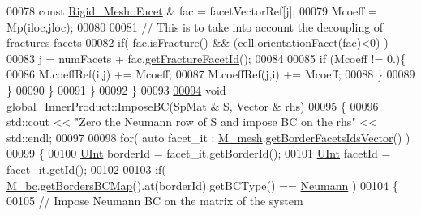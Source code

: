 \begin{DoxyCode}
00078                 \textcolor{keyword}{const} \hyperlink{classFVCode3D_1_1Rigid__Mesh_1_1Facet}{Rigid\_Mesh::Facet} & fac = facetVectorRef[j];
00079                 Mcoeff = Mp(iloc,jloc);
00080                 
00081                 \textcolor{comment}{// This is to take into account the decoupling of fractures facets}
00082                                 \textcolor{keywordflow}{if}( fac.\hyperlink{classFVCode3D_1_1Rigid__Mesh_1_1Facet_aed3f579d52847e839501f647e90c35ab}{isFracture}() && (cell.orientationFacet(fac)<0) )
00083                                         j = numFacets + fac.\hyperlink{classFVCode3D_1_1Rigid__Mesh_1_1Facet_a08dc369eccd02b29133187cede7511eb}{getFractureFacetId}();
00084 
00085                 \textcolor{keywordflow}{if} (Mcoeff != 0.)\{
00086                     M.coeffRef(i,j) += Mcoeff;
00087                     M.coeffRef(j,i) += Mcoeff;
00088                 \} 
00089             \}
00090         \}
00091         \}
00092 \}
00093 
\hypertarget{global__operator_8cpp_source.tex_l00094}{}\hyperlink{classFVCode3D_1_1global__InnerProduct_a708f68bfd33ad98c55d64c0098733fed}{00094} \textcolor{keywordtype}{void} \hyperlink{classFVCode3D_1_1global__InnerProduct_a708f68bfd33ad98c55d64c0098733fed}{global\_InnerProduct::ImposeBC}(\hyperlink{namespaceFVCode3D_ac1032289d96638cf0ad6c52ef639095f}{SpMat} & S, 
      \hyperlink{namespaceFVCode3D_a16ccf345652402bccd1a5d2e6782526c}{Vector} & rhs)      
00095 \{
00096         std::cout << \textcolor{stringliteral}{"Zero the Neumann row of S and impose BC on the rhs"} << std::endl;
00097         
00098         \textcolor{keywordflow}{for}( \textcolor{keyword}{auto} facet\_it : \hyperlink{classFVCode3D_1_1global__Operator_a027911d0f801f6f19a3006329ec30a7f}{M\_mesh}.\hyperlink{classFVCode3D_1_1Rigid__Mesh_aa72b7fad937f0d1586fc10b176ef5d3e}{getBorderFacetsIdsVector}() )
00099         \{       
00100                 \hyperlink{namespaceFVCode3D_a4bf7e328c75d0fd504050d040ebe9eda}{UInt} borderId = facet\_it.getBorderId();
00101                 \hyperlink{namespaceFVCode3D_a4bf7e328c75d0fd504050d040ebe9eda}{UInt} facetId  = facet\_it.getId();
00102                         
00103                 \textcolor{keywordflow}{if}( \hyperlink{classFVCode3D_1_1global__InnerProduct_a62bbb87bc4710a73980603b8b77ffda8}{M\_bc}.\hyperlink{classFVCode3D_1_1BoundaryConditions_a5b53a81bdab88709fae14892bfe6a7c9}{getBordersBCMap}().at(borderId).getBCType() == 
      \hyperlink{namespaceFVCode3D_a73660061f11f1671164ce171a053f8c5a30212425b27314b01b40f4984dbf850a}{Neumann} )
00104                 \{
00105                         \textcolor{comment}{// Impose Neumann BC on the matrix of the system}

\end{DoxyCode}
